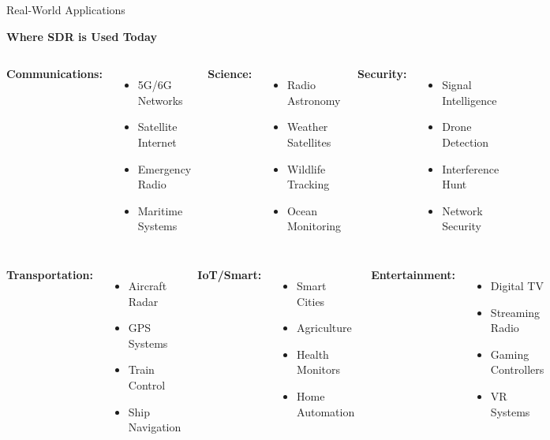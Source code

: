 \documentclass[aspectratio=169,11pt]{beamer}
\begin{document}
\begin{frame}{Real-World Applications}
\begin{center}
\Large\textbf{Where SDR is Used Today}
\end{center}
\vspace{0.5em}
\begin{columns}
\textbf{Communications:}
\begin{itemize}
    \item 5G/6G Networks
    \item Satellite Internet
    \item Emergency Radio
    \item Maritime Systems
\end{itemize}

\textbf{Science:}
\begin{itemize}
    \item Radio Astronomy
    \item Weather Satellites
    \item Wildlife Tracking
    \item Ocean Monitoring
\end{itemize}

\textbf{Security:}
\begin{itemize}
    \item Signal Intelligence
    \item Drone Detection
    \item Interference Hunt
    \item Network Security
\end{itemize}
\end{columns}
\vspace{0.5em}
\begin{columns}
\textbf{Transportation:}
\begin{itemize}
    \item Aircraft Radar
    \item GPS Systems
    \item Train Control
    \item Ship Navigation
\end{itemize}

\textbf{IoT/Smart:}
\begin{itemize}
    \item Smart Cities
    \item Agriculture
    \item Health Monitors
    \item Home Automation
\end{itemize}

\textbf{Entertainment:}
\begin{itemize}
    \item Digital TV
    \item Streaming Radio
    \item Gaming Controllers
    \item VR Systems
\end{itemize}
\end{columns}
\end{frame}
\end{document}
